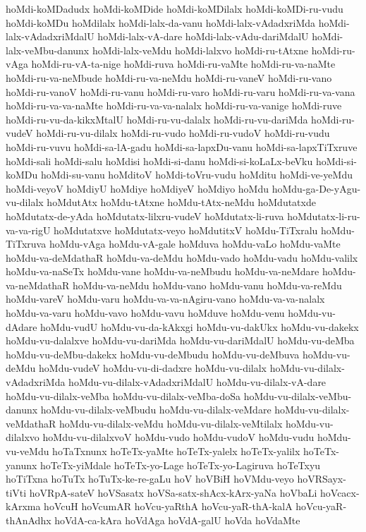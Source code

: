 {hoMdi-koMDadudx
hoMdi-koMDide
hoMdi-koMDilalx
hoMdi-koMDi-ru-vudu
hoMdi-koMDu
hoMdilalx
hoMdi-lalx-da-vanu
hoMdi-lalx-vAdadxriMda
hoMdi-lalx-vAdadxriMdalU
hoMdi-lalx-vA-dare
hoMdi-lalx-vAdu-dariMdalU
hoMdi-lalx-veMbu-danunx
hoMdi-lalx-veMdu
hoMdi-lalxvo
hoMdi-ru-tAtxne
hoMdi-ru-vAga
hoMdi-ru-vA-ta-nige
hoMdi-ruva
hoMdi-ru-vaMte
hoMdi-ru-va-naMte
hoMdi-ru-va-neMbude
hoMdi-ru-va-neMdu
hoMdi-ru-vaneV
hoMdi-ru-vano
hoMdi-ru-vanoV
hoMdi-ru-vanu
hoMdi-ru-varo
hoMdi-ru-varu
hoMdi-ru-va-vana
hoMdi-ru-va-va-naMte
hoMdi-ru-va-va-nalalx
hoMdi-ru-va-vanige
hoMdi-ruve
hoMdi-ru-vu-da-kikxMtalU
hoMdi-ru-vu-dalalx
hoMdi-ru-vu-dariMda
hoMdi-ru-vudeV
hoMdi-ru-vu-dilalx
hoMdi-ru-vudo
hoMdi-ru-vudoV
hoMdi-ru-vudu
hoMdi-ru-vuvu
hoMdi-sa-lA-gadu
hoMdi-sa-lapxDu-vanu
hoMdi-sa-lapxTiTxruve
hoMdi-sali
hoMdi-salu
hoMdisi
hoMdi-si-danu
hoMdi-si-koLaLx-beVku
hoMdi-si-koMDu
hoMdi-su-vanu
hoMditoV
hoMdi-toVru-vudu
hoMditu
hoMdi-ve-yeMdu
hoMdi-veyoV
hoMdiyU
hoMdiye
hoMdiyeV
hoMdiyo
hoMdu
hoMdu-ga-De-yAgu-vu-dilalx
hoMdutAtx
hoMdu-tAtxne
hoMdu-tAtx-neMdu
hoMdutatxde
hoMdutatx-de-yAda
hoMdutatx-lilxru-vudeV
hoMdutatx-li-ruva
hoMdutatx-li-ru-va-va-rigU
hoMdutatxve
hoMdutatx-veyo
hoMdutitxV
hoMdu-TiTxralu
hoMdu-TiTxruva
hoMdu-vAga
hoMdu-vA-gale
hoMduva
hoMdu-vaLo
hoMdu-vaMte
hoMdu-va-deMdathaR
hoMdu-va-deMdu
hoMdu-vado
hoMdu-vadu
hoMdu-valilx
hoMdu-va-naSeTx
hoMdu-vane
hoMdu-va-neMbudu
hoMdu-va-neMdare
hoMdu-va-neMdathaR
hoMdu-va-neMdu
hoMdu-vano
hoMdu-vanu
hoMdu-va-reMdu
hoMdu-vareV
hoMdu-varu
hoMdu-va-va-nAgiru-vano
hoMdu-va-va-nalalx
hoMdu-va-varu
hoMdu-vavo
hoMdu-vavu
hoMduve
hoMdu-venu
hoMdu-vu-dAdare
hoMdu-vudU
hoMdu-vu-da-kAkxgi
hoMdu-vu-dakUkx
hoMdu-vu-dakekx
hoMdu-vu-dalalxve
hoMdu-vu-dariMda
hoMdu-vu-dariMdalU
hoMdu-vu-deMba
hoMdu-vu-deMbu-dakekx
hoMdu-vu-deMbudu
hoMdu-vu-deMbuva
hoMdu-vu-deMdu
hoMdu-vudeV
hoMdu-vu-di-dadxre
hoMdu-vu-dilalx
hoMdu-vu-dilalx-vAdadxriMda
hoMdu-vu-dilalx-vAdadxriMdalU
hoMdu-vu-dilalx-vA-dare
hoMdu-vu-dilalx-veMba
hoMdu-vu-dilalx-veMba-doSa
hoMdu-vu-dilalx-veMbu-danunx
hoMdu-vu-dilalx-veMbudu
hoMdu-vu-dilalx-veMdare
hoMdu-vu-dilalx-veMdathaR
hoMdu-vu-dilalx-veMdu
hoMdu-vu-dilalx-veMtilalx
hoMdu-vu-dilalxvo
hoMdu-vu-dilalxvoV
hoMdu-vudo
hoMdu-vudoV
hoMdu-vudu
hoMdu-vu-veMdu
hoTaTxnunx
hoTeTx-yaMte
hoTeTx-yalelx
hoTeTx-yalilx
hoTeTx-yanunx
hoTeTx-yiMdale
hoTeTx-yo-Lage
hoTeTx-yo-Lagiruva
hoTeTxyu
hoTiTxna
hoTuTx
hoTuTx-ke-re-gaLu
hoV
hoVBiH
hoVMdu-veyo
hoVRSayx-tiVti
hoVRpA-sateV
hoVSasatx
hoVSa-satx-shAcx-kArx-yaNa
hoVbaLi
hoVcacx-kArxma
hoVcuH
hoVcumAR
hoVcu-yaRthA
hoVcu-yaR-thA-kalA
hoVcu-yaR-thAnAdhx
hoVdA-ca-kAra
hoVdAga
hoVdA-galU
hoVda
hoVdaMte
}
